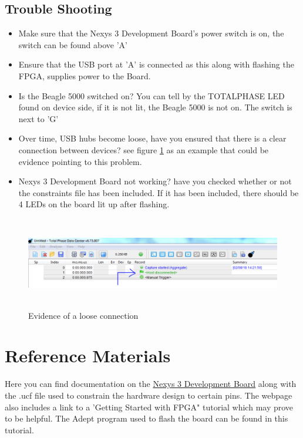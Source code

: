 \documentclass[10pt,a4paper]{article}
\begin{document}
\subsection{Trouble Shooting}

\begin{itemize}
	\item Make sure that the Nexys 3 Development Board's power switch is on, the switch can be found above 'A'
	\item Ensure that the USB port at 'A' is connected as this along with flashing the FPGA, supplies power to the Board.
	\item Is the Beagle 5000 switched on? You can tell by the TOTALPHASE LED found on device side, if it is not lit, the Beagle 5000 is not on. The switch is next to 'G'
	\item Over time, USB hubs become loose, have you ensured that there is a clear connection between devices? see figure \ref{fig:Loose Connection Evidence} as an example that could be evidence pointing to this problem.
	\item Nexys 3 Development Board not working? have you checked whether or not the constraints file has been included. If it has been included, there should be 4 LEDs on the board lit up after flashing.
\end{itemize}

\begin{figure}
	\includegraphics[width=12cm,height=4cm]{Loose_Connection_Evidence.PNG}
	\caption{Evidence of a loose connection}
	\label{fig:Loose Connection Evidence}
\end{figure}

\section{Reference Materials}
Here you can find documentation on the 
\href{https://reference.digilentinc.com/reference/programmable-logic/nexys-3/start}{Nexys 3 Development Board}
along with the .ucf file used to constrain the hardware design to certain pins. The webpage also includes a link to a 'Getting Started with FPGA" tutorial which may prove to be helpful. The Adept program used to flash the board can be found in this tutorial.\\
\end{document}
